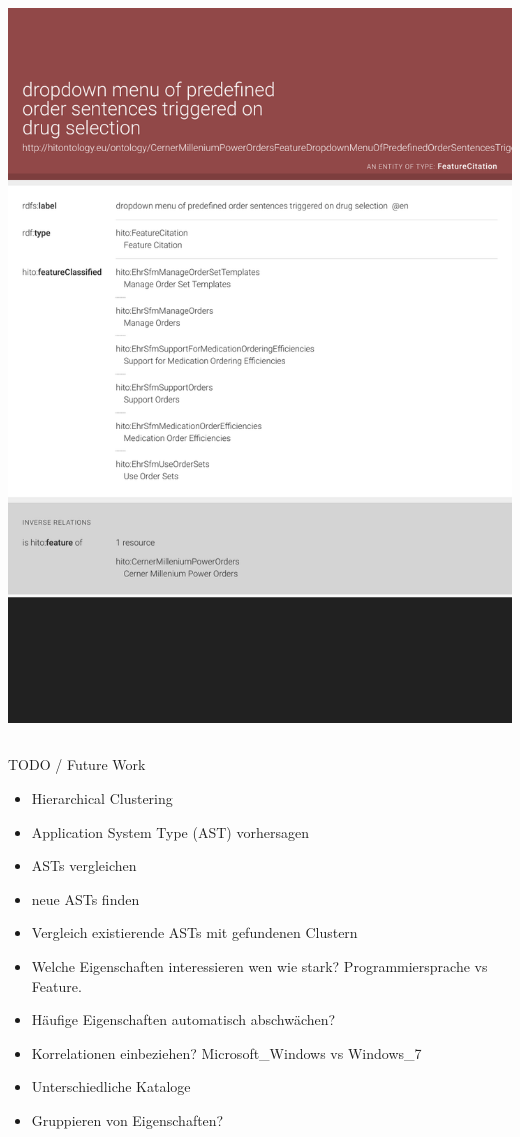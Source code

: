 \documentclass[aspectratio=1610,handout]{beamer}
\begin{document}
\begin{frame}[plain]
\begin{columns}
\begin{column}{.55\textwidth}
  \centering\includegraphics[width=1.0\textwidth,height=1.0\textheight,keepaspectratio,trim=0 100 0 0,clip]{cernermillenium-lodview-feature.pdf}
 \end{column}
\end{columns}
\end{frame}



\begin{frame}{TODO / Future Work}
\begin{itemize}
\item Hierarchical Clustering
\item Application System Type (AST) vorhersagen
\item ASTs vergleichen
\item neue ASTs finden
\item Vergleich existierende ASTs mit gefundenen Clustern
\pause
\vspace{1em}
\item Welche Eigenschaften interessieren wen wie stark? Programmiersprache vs Feature.
\pause
\item Häufige Eigenschaften automatisch abschwächen?
\pause
\item Korrelationen einbeziehen? Microsoft\_Windows vs Windows\_7
\pause
\item Unterschiedliche Kataloge
\pause
\item Gruppieren von Eigenschaften?
\end{itemize}
\end{frame}
\end{document}
